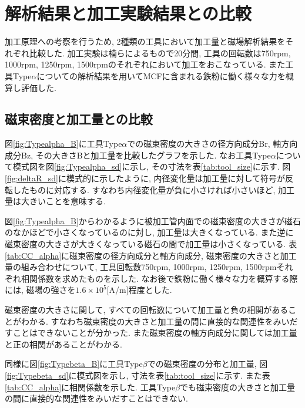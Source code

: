 \documentclass[11pt]{jarticle}
\begin{document}
\newpage

\section{解析結果と加工実験結果との比較}
加工原理への考察を行うため, 2種類の工具において加工量と磁場解析結果をそれぞれ比較した. 加工実験は楠ら\cite{楠}によるもので20分間, 工具の回転数は750rpm, 1000rpm, 1250rpm, 1500rpmのそれぞれにおいて加工をおこなっている. また工具Type$\alpha$についての解析結果を用いてMCFに含まれる鉄粉に働く様々な力を概算し評価した. 

  \subsection{磁束密度と加工量との比較}
図\ref{fig:Typealpha_B}に工具Type$\alpha$での磁束密度の大きさの径方向成分Br, 軸方向成分Bz, その大きさBと加工量を比較したグラフを示した. なお工具Type$\alpha$について模式図を図\ref{fig:Typealpha_sd}に示し, その寸法を表\ref{tab:tool_size}に示す. 図\ref{fig:deltaR_sd}に模式的に示したように, 内径変化量は加工量に対して符号が反転したものに対応する. すなわち内径変化量が負に小さければ小さいほど, 加工量は大きいことを意味する. \par
図\ref{fig:Typealpha_B}からわかるように被加工管内面での磁束密度の大きさが磁石のなかほどで小さくなっているのに対し, 加工量は大きくなっている. また逆に磁束密度の大きさが大きくなっている磁石の間で加工量は小さくなっている. 表\ref{tab:CC_alpha}に磁束密度の径方向成分と軸方向成分, 磁束密度の大きさと加工量の組み合わせについて, 工具回転数750rpm, 1000rpm, 1250rpm, 1500rpmそれぞれ相関係数を求めたものを示した. なお後で鉄粉に働く様々な力を概算する際には, 磁場の強さを$1.6\times10^5$[A/m]程度とした. \par
磁束密度の大きさに関して, すべての回転数について加工量と負の相関があることがわかる. すなわち磁束密度の大きさと加工量の間に直接的な関連性をみいだすことはできないことが分かった. また磁束密度の軸方向成分に関しては加工量と正の相関があることがわかる. \par
同様に図\ref{fig:Typebeta_B}に工具Type$\beta$での磁束密度の分布と加工量, 図\ref{fig:Typebeta_sd}に模式図を示し, 寸法を表\ref{tab:tool_size}に示す. また表\ref{tab:CC_alpha}に相関係数を示した. 工具Type$\beta$でも磁束密度の大きさと加工量の間に直接的な関連性をみいだすことはできない. 
\end{document}
